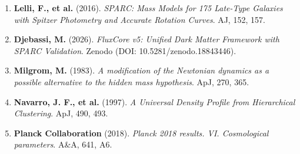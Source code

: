 \documentclass[
]{article}
\providecommand{\tightlist}{%
  \setlength{\itemsep}{0pt}\setlength{\parskip}{0pt}}
\begin{document}
\begin{enumerate}
\def\labelenumi{\arabic{enumi}.}
\tightlist
\item
  \textbf{Lelli, F., et al.} (2016). \emph{SPARC: Mass Models for 175
  Late-Type Galaxies with Spitzer Photometry and Accurate Rotation
  Curves}. AJ, 152, 157.
\item
  \textbf{Djebassi, M.} (2026). \emph{FluxCore v5: Unified Dark Matter
  Framework with SPARC Validation}. Zenodo (DOI:
  10.5281/zenodo.18843446).
\item
  \textbf{Milgrom, M.} (1983). \emph{A modification of the Newtonian
  dynamics as a possible alternative to the hidden mass hypothesis}.
  ApJ, 270, 365.
\item
  \textbf{Navarro, J. F., et al.} (1997). \emph{A Universal Density
  Profile from Hierarchical Clustering}. ApJ, 490, 493.
\item
  \textbf{Planck Collaboration} (2018). \emph{Planck 2018 results. VI.
  Cosmological parameters}. A\&A, 641, A6.
\end{enumerate}
\end{document}
